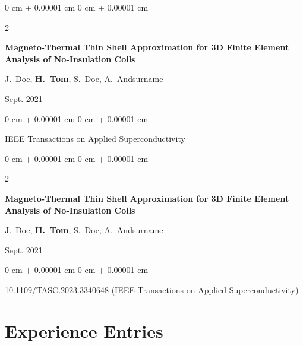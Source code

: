 \documentclass[10pt, letterpaper]{article}
\newenvironment{onecolentry}{
    \begin{adjustwidth}{
        0 cm + 0.00001 cm
    }{
        0 cm + 0.00001 cm
    }
}{
    \end{adjustwidth}
} %
\newenvironment{twocolentry}[2][]{
    \onecolentry
    \def\secondColumn{#2}
    \setcolumnwidth{\fill, 4.5 cm}
    \begin{paracol}{2}
}{
    \switchcolumn \raggedleft \secondColumn
    \end{paracol}
    \endonecolentry
} %
\begin{document}
        \vspace{0.2 cm}

        \begin{samepage}
            \begin{twocolentry}{
                Sept. 2021
            }
                \textbf{Magneto-Thermal Thin Shell Approximation for 3D Finite Element Analysis of No-Insulation Coils}

                \vspace{0.10 cm}

                \mbox{J. Doe}, \mbox{\textbf{H. Tom}}, \mbox{S. Doe}, \mbox{A. Andsurname}
            \end{twocolentry}


            \vspace{0.10 cm}

            \begin{onecolentry}
        IEEE Transactions on Applied Superconductivity    \end{onecolentry}
        \end{samepage}

        \vspace{0.2 cm}

        \begin{samepage}
            \begin{twocolentry}{
                Sept. 2021
            }
                \textbf{Magneto-Thermal Thin Shell Approximation for 3D Finite Element Analysis of No-Insulation Coils}

                \vspace{0.10 cm}

                \mbox{J. Doe}, \mbox{\textbf{H. Tom}}, \mbox{S. Doe}, \mbox{A. Andsurname}
            \end{twocolentry}


            \vspace{0.10 cm}

            \begin{onecolentry}
        \href{https://doi.org/10.1109/TASC.2023.3340648}{10.1109/TASC.2023.3340648} (IEEE Transactions on Applied Superconductivity)    \end{onecolentry}
        \end{samepage}


    
    \section{Experience Entries}
\end{document}
